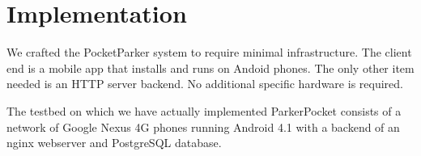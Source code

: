 \section{Implementation}
\label{sec-implementation}

We crafted the PocketParker system to require minimal infrastructure.  The
client end is a mobile app that installs and runs on Andoid phones.  The
only other item needed is an HTTP server backend.  No additional specific
hardware is required.

The testbed on which we have actually implemented ParkerPocket consists of
a network of Google Nexus 4G phones running Android 4.1 with a backend of
an nginx webserver and PostgreSQL database.





